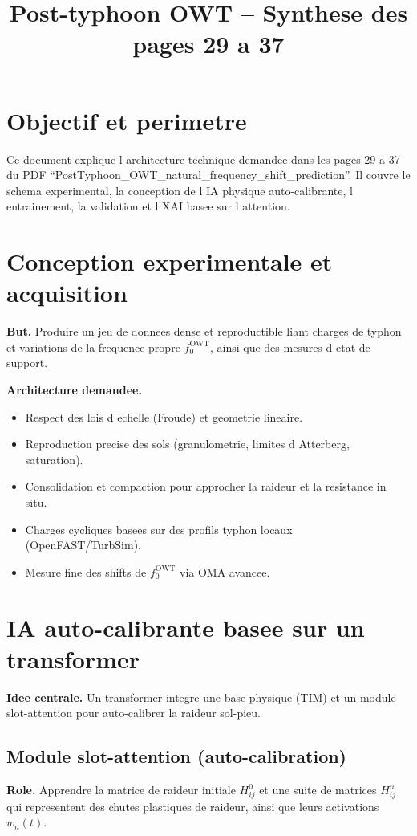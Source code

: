 \documentclass[11pt]{article}
\title{Post-typhoon OWT -- Synthese des pages 29 a 37}
\author{}
\date{}
\begin{document}
\maketitle

\section{Objectif et perimetre}
Ce document explique l architecture technique demandee dans les pages 29 a 37 du PDF
``PostTyphoon\_OWT\_natural\_frequency\_shift\_prediction''. Il couvre le schema
experimental, la conception de l IA physique auto-calibrante, l entrainement, la validation
et l XAI basee sur l attention.

\section{Conception experimentale et acquisition}
\textbf{But.} Produire un jeu de donnees dense et reproductible liant charges de typhon et
variations de la frequence propre $f_0^{\mathrm{OWT}}$, ainsi que des mesures d etat de support.

\textbf{Architecture demandee.}
\begin{itemize}
  \item Respect des lois d echelle (Froude) et geometrie lineaire.
  \item Reproduction precise des sols (granulometrie, limites d Atterberg, saturation).
  \item Consolidation et compaction pour approcher la raideur et la resistance in situ.
  \item Charges cycliques basees sur des profils typhon locaux (OpenFAST/TurbSim).
  \item Mesure fine des shifts de $f_0^{\mathrm{OWT}}$ via OMA avancee.
\end{itemize}

\section{IA auto-calibrante basee sur un transformer}
\textbf{Idee centrale.} Un transformer integre une base physique (TIM) et un module
slot-attention pour auto-calibrer la raideur sol-pieu.

\subsection{Module slot-attention (auto-calibration)}
\textbf{Role.} Apprendre la matrice de raideur initiale $H_{ij}^0$ et une suite de matrices
$H_{ij}^n$ qui representent des chutes plastiques de raideur, ainsi que leurs activations
$w_n(t)$.
\end{document}
